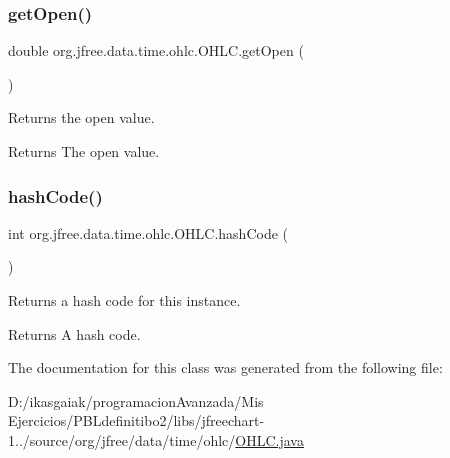 \subsubsection{\texorpdfstring{get\+Open()}{getOpen()}}
{\footnotesize\ttfamily double org.\+jfree.\+data.\+time.\+ohlc.\+O\+H\+L\+C.\+get\+Open (\begin{DoxyParamCaption}{ }\end{DoxyParamCaption})}

Returns the open value.

\begin{DoxyReturn}{Returns}
The open value. 
\end{DoxyReturn}
\mbox{\label{classorg_1_1jfree_1_1data_1_1time_1_1ohlc_1_1_o_h_l_c_aa7b39c1dcc3ac1162c87d271d3d4a231}} 
\subsubsection{\texorpdfstring{hash\+Code()}{hashCode()}}
{\footnotesize\ttfamily int org.\+jfree.\+data.\+time.\+ohlc.\+O\+H\+L\+C.\+hash\+Code (\begin{DoxyParamCaption}{ }\end{DoxyParamCaption})}

Returns a hash code for this instance.

\begin{DoxyReturn}{Returns}
A hash code. 
\end{DoxyReturn}


The documentation for this class was generated from the following file\+:\begin{DoxyCompactItemize}
\item 
D\+:/ikasgaiak/programacion\+Avanzada/\+Mis Ejercicios/\+P\+B\+Ldefinitibo2/libs/jfreechart-\/1../source/org/jfree/data/time/ohlc/\mbox{\hyperlink{_o_h_l_c_8java}{O\+H\+L\+C.\+java}}\end{DoxyCompactItemize}
